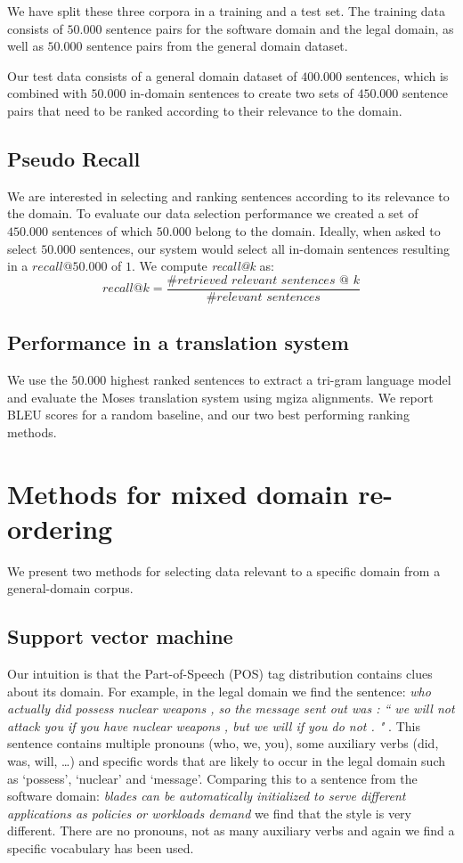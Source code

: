 \documentclass[11pt]{article}
\begin{document}
We have split these three corpora in a training and a test set. The training data consists of $50.000$ sentence pairs for the software domain and the legal domain, as well as $50.000$ sentence pairs from the general domain dataset.

Our test data consists of a general domain dataset of $400.000$ sentences, which is combined with $50.000$ in-domain sentences to create two sets of $450.000$ sentence pairs that need to be ranked according to their relevance to the domain.

\subsection{Pseudo Recall}
We are interested in selecting and ranking sentences according to its relevance to the domain. To evaluate our data selection performance we created a set of $450.000$ sentences of which $50.000$ belong to the domain. Ideally, when asked to select $50.000$ sentences, our system would select all in-domain sentences resulting in a $\textit{recall@}50.000$ of $1$. We compute \textit{recall@k} as: 
$$ \textit{recall@k} = \frac{\textit{\# retrieved relevant sentences @ k}}{\textit{\# relevant sentences}} $$

\subsection{Performance in a translation system}
We use the $50.000$ highest ranked sentences to extract a tri-gram language model and evaluate the Moses \cite{moses} translation system using mgiza alignments. We report BLEU scores for a random baseline, and our two best performing ranking methods.

\section{Methods for mixed domain re-ordering}
\label{sec:methods}
We present two methods for selecting data relevant to a specific domain from a general-domain corpus.

\subsection{Support vector machine}
Our intuition is that the Part-of-Speech (POS) tag distribution contains clues about its domain. For example, in the legal domain we find the sentence: \textit{who actually did possess nuclear weapons , so the message sent out was : `` we will not attack you if you have nuclear weapons , but we will if you do not . " }. This sentence contains multiple pronouns (who, we, you), some auxiliary verbs (did, was, will, \dots) and specific words that are likely to occur in the legal domain such as `possess', `nuclear' and `message'. Comparing this to a sentence from the software domain: 
\textit{blades can be automatically initialized to serve different applications as policies or workloads demand} we find that the style is very different. There are no pronouns, not as many auxiliary verbs and again we find a specific vocabulary has been used.
\end{document}
